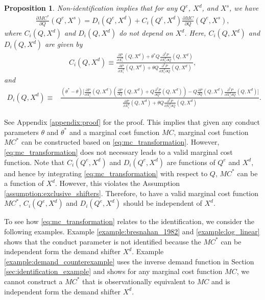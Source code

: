 \documentclass[11pt, a4paper]{article}
\newtheorem{proposition}{Proposition}
\theoremstyle{remark}
\begin{document}
\begin{proposition}\label{proposition:non-identification_transformation}
    Non-identification implies that for any $Q^e$, $X^{d}$, and $X^{s}$, we have 
    \begin{align}
        \frac{\partial MC^{*}}{\partial Q}(Q^e, X^{s}) = D_i(Q^e, X^{d}) + C_i(Q^e, X^{d})\frac{\partial MC}{\partial Q}(Q^e, X^{s}), \label{eq:mc_transformation}
    \end{align}
    where $C_i(Q, X^{d})$ and $D_i(Q, X^{d})$ do not depend on $X^{d}$.
    Here, $C_i(Q, X^{d})$ and $D_i(Q, X^{d})$ are given by
    \begin{align}
        C_i(Q, X^{d}) \equiv \frac{\frac{\partial P}{\partial X^{d}_i}(Q, X^{d}) + \theta^{*} Q\frac{\partial^2 P}{\partial X^{d}_{i}\partial Q}(Q, X^{d}) }{\frac{\partial P}{\partial X^{d}_i}(Q, X^{d}) + \theta Q\frac{\partial^2 P}{\partial X^{d}_{i}\partial Q}(Q, X^{d}) },\label{eq:ratio_marginal_revenue}
    \end{align}
    and
    \begin{align}
        D_i(Q, X^{d}) \equiv &\frac{(\theta^{*} - \theta)\Bigg[\frac{\partial P}{\partial X^{d}_i}(Q, X^{d}) \left(\frac{\partial P}{\partial Q}(Q, X^{d}) + Q\frac{\partial^2 P}{\partial Q^2}(Q, X^{d})\right)- Q \frac{\partial P}{\partial Q}(Q, X^{d}) \frac{\partial^2 P}{\partial X^{d}_i\partial Q}(Q, X^{d}) \Bigg]}{\frac{\partial P}{\partial X^{d}_i}(Q, X^{d}) + \theta Q\frac{\partial^2 P}{\partial X^{d}_{i}\partial Q}(Q, X^{d})}.\label{eq:intercation_derivative_demand}
    \end{align}
\end{proposition}
See Appendix \ref{appendix:proof} for the proof.
This implies that given any conduct parameters $\theta$ and $\theta^{*}$ and a marginal cost function $MC$, marginal cost function $MC^{*}$ can be constructed based on \eqref{eq:mc_transformation}.
However, \eqref{eq:mc_transformation} does not necessary leads to a valid marginal cost function.
Note that $C_i(Q^e, X^{d})$ and $D_i(Q^e, X^{d})$ are functions of $Q^e$ and $X^{d}$, and hence by integrating \eqref{eq:mc_transformation} with respect to $Q$, $MC^{*}$ can be a function of $X^{d}$.
However, this violates the Assumption \ref{assumption:exclusive_shifters}.
Therefore, to have a valid marginal cost function $MC^{*}$, $C_i(Q^e, X^{d})$ and $D_i(Q^e, X^{d})$ should be independent of $X^{d}$.

To see how \eqref{eq:mc_transformation} relates to the identification, we consider the following examples.
Example \ref{example:bresnahan_1982} and \ref{example:log_linear} shows that the conduct parameter is not identified because the $MC^{*}$ can be independent form the demand shifter $X^{d}$.
Example \ref{example:demand_counterexample} uses the inverse demand function in Section \ref{sec:identification_example} and shows for any marginal cost function $MC$, we cannot construct a $MC^{*}$ that is observationally equivalent to $MC$ and is independent form the demand shifter $X^{d}$.
\end{document}
